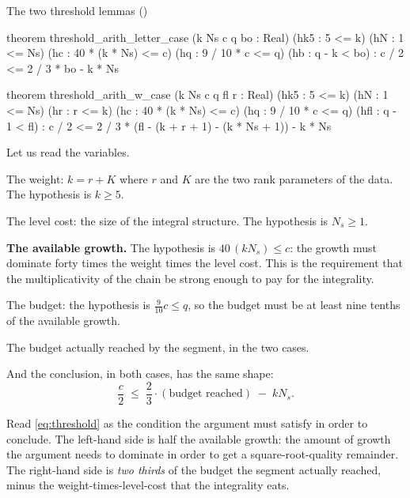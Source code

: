 \begin{seamnote}{The two threshold lemmas ()}
{\footnotesize
\begin{leanquote}
theorem threshold_arith_letter_case (k Ns c q bo : Real)
(hk5 : 5 <= k) (hN : 1 <= Ns) (hc : 40 * (k * Ns) <= c) (hq
      : 9 / 10 * c <= q)
    (hb : q - k < bo) : c / 2 <= 2 / 3 * bo - k * Ns

theorem threshold_arith_w_case (k Ns c q fl r : Real)
(hk5 : 5 <= k) (hN : 1 <= Ns) (hr : r <= k) (hc : 40 * (k *
      Ns) <= c)
    (hq : 9 / 10 * c <= q) (hfl : q - 1 < fl) :
c / 2 <= 2 / 3 * (fl - (k + r + 1) - (k * Ns + 1)) - k * Ns
\end{leanquote}
}
\end{seamnote}

Let us read the variables.

\begin{description}[style=nextline,leftmargin=0pt,labelwidth=0pt,labelsep=0pt,font=\sffamily\bfseries\small,
  itemsep=6pt]
\item[$k$] The weight: $k = r + K$ where $r$ and $K$ are the two rank
parameters of the data. The hypothesis is $k \ge 5$.
\item[$N_s$] The level cost: the size of the integral structure. The
hypothesis is $N_s \ge 1$.
\item[$c$] \textbf{The available growth.} The hypothesis is
$40\,(k N_s) \le c$: the growth must dominate forty times the weight times the
level cost. This is the requirement that the multiplicativity of the chain be
strong enough to pay for the integrality.
\item[$q$] The budget: the hypothesis is $\tfrac{9}{10}c \le q$, so the budget
must be at least nine tenths of the available growth.
\item[$bo$, $fl$] The budget actually reached by the segment, in the two cases.
\end{description}

And the conclusion, in both cases, has the same shape:
\begin{equation}
\frac{c}{2} \;\le\; \frac{2}{3}\cdot(\text{budget reached}) \;-\; k N_s.
\label{eq:threshold}
\end{equation}

Read \eqref{eq:threshold} as the condition the argument must satisfy in order
to conclude. The left-hand side is half the available growth: the amount of
growth the argument needs to dominate in order to get a square-root-quality
remainder. The right-hand side is \emph{two thirds} of the budget the segment
actually reached, minus the weight-times-level-cost that the integrality eats.

